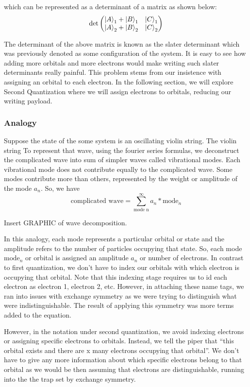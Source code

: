 \documentclass{article}
\begin{document}
    which can be represented as a determinant of a matrix as shown below:
    \[
    \det\begin{pmatrix}
    \ket{A}_1 + \ket{B}_1 & \ket{C}_1 \\ \ket{A}_2 + \ket{B}_2 & \ket{C}_2
    \end{pmatrix}
    \]

    The determinant of the above matrix is known as the slater determinant
    which was previously denoted as some configuration of the system. It is
    easy to see how adding more orbitals and more electrons would make
    writing such slater determinants really painful. This problem stems
    from our insistence with assigning an orbital to each electron. In the
    following section, we will explore Second Quantization where we will
    assign electrons to orbitals, reducing our writing payload.
    \subsubsection{Analogy}
    Suppose the state of the some system is an oscillating violin string. The
    violin string
     To represent that wave, using the fourier series formulas, we
    deconstruct the complicated wave into sum of simpler waves called vibrational
    modes. Each vibrational mode does not contribute equally to the
    complicated wave. Some modes contribute more than others, represented by
    the weight or amplitude of the mode \(a_n\). So, we have
    \[\text{complicated wave} = \sum_{\text{mode n}}^{\infty} a_n * \text{mode}_n\]

    Insert GRAPHIC of wave decomposition.

    In this analogy, each mode represents a particular orbital or state and the
    amplitude refers to the number of particles occupying that state. So, each
    mode \(\text{mode}_n\) or orbital is assigned an amplitude \(a_n\) or
    number of electrons. In contrast to first quantization,
    we don't have to index our orbitals with which electron is occupying
     that orbital. Note that this indexing stage requires us to id each electron
     as electron 1, electron 2, etc. However, in attaching these name tags,
     we ran into issues with exchange symmetry as we were trying to distinguish
     what were indistinguishable. The result of applying this symmetry was more
     terms added to the equation.

    However, in the notation under second quantization, we avoid indexing
    electrons or assigning specific electrons to orbitals. Instead, we
    tell the piper that ``this orbital exists and there are x many electrons
    occupying that orbital''. We don't have to give any more information
    about which specific electrons belong to that orbital as we would be
    then assuming that electrons are distinguishable, running into the the
    trap set by exchange symmetry.
\end{document}
